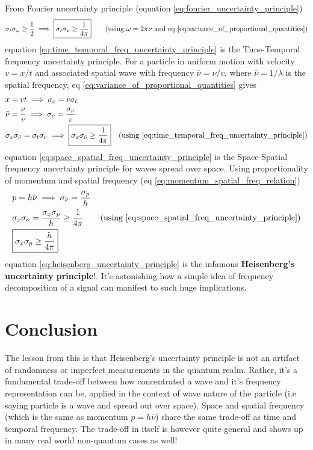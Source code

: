 \documentclass[11pt, a4paper]{article}
\let\oldsection\section
\renewcommand{\section}{%
	\setcounter{equation}{0}%
	\oldsection%
}
\newcommand{\eqrefnp}[1]{\textup{\ref{#1}}}
\newcommand{\stdev}[1]{\sigma_{#1}}
\begin{document}
From Fourier uncertainty principle (equation \eqrefnp{eq:fourier_uncertainty_principle})
\begin{equation}\label{eq:time_temporal_freq_uncertainty_principle}
	\stdev{t} \stdev{\omega} \geq \frac{1}{2} \implies \boxed{\stdev{t} \stdev{\nu} \geq \frac{1}{4\pi}} \qquad \text{(using $\omega = 2\pi \nu$ and eq \eqrefnp{eq:variance_of_proportional_quantities})}
\end{equation}
equation \eqref{eq:time_temporal_freq_uncertainty_principle} is the Time-Temporal frequency uncertainty principle. For a particle in uniform motion with velocity $v = x / t$ and associated spatial wave with frequency $\bar{\nu} = \nu / v$, where $\bar{\nu} = 1/\lambda$ is the spatial frequency, eq \eqref{eq:variance_of_proportional_quantities} gives
\begin{align}
 	& x = vt \implies \stdev{x} = v\stdev{t} \nonumber \\
 	& \bar{\nu} = \frac{\nu}{v} \implies \stdev{\bar{\nu}} = \frac{\stdev{\nu}}{v} \nonumber \\
 	& \stdev{x}\stdev{\bar{\nu}} = \stdev{t} \stdev{\nu} \implies \boxed{\stdev{x}\stdev{\bar{\nu}} \geq \frac{1}{4\pi}} \quad \text{(using \eqrefnp{eq:time_temporal_freq_uncertainty_principle})} \label{eq:space_spatial_freq_uncertainty_principle}
\end{align}
equation \eqref{eq:space_spatial_freq_uncertainty_principle} is the Space-Spatial frequency uncertainty principle for waves spread over space. Using proportionality of momentum and spatial frequency (eq \eqrefnp{eq:momentum_spatial_freq_relation})
\begin{align}
	& p = h \bar{\nu} \implies \stdev{\bar{\nu}} = \frac{\stdev{p}}{h}  \nonumber \\
	& \stdev{x}\stdev{\bar{\nu}} = \frac{\stdev{x}\stdev{p}}{h} \geq \frac{1}{4 \pi} \nonumber \tag{using \eqrefnp{eq:space_spatial_freq_uncertainty_principle}} \\
	& \boxed{\stdev{x}\stdev{p} \geq \frac{h}{4 \pi}} \label{eq:heisenberg_uncertainty_principle}
\end{align}
equation \eqref{eq:heisenberg_uncertainty_principle} is the infamous \textbf{Heisenberg's uncertainty principle}!. It's astonishing how a simple idea of frequency decomposition of a signal can manifest to such huge implications.

\section{Conclusion}
The lesson from this is that Heisenberg's uncertainty principle is not an artifact of randomness or imperfect measurements in the quantum realm. Rather, it's a fundamental trade-off between how concentrated a wave and it's frequency representation can be, applied in the context of wave nature of the particle (i.e saying particle is a wave and spread out over space). Space and spatial frequency (which is the same as momentum $p=h\bar{\nu}$) share the same trade-off as time and temporal frequency. The trade-off in itself is however quite general and shows up in many real world non-quantum cases as well!
\end{document}
